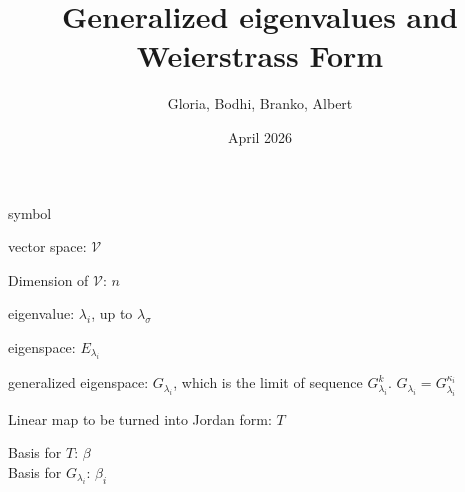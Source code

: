 \documentclass{article}
\title{Generalized eigenvalues and Weierstrass Form}
\author{Gloria, Bodhi, Branko, Albert}
\date{April 2026}
\theoremstyle{definition}
\newcommand{\0}{\vec{0}}
\newcommand{\vecspace}[1]{\mathcal{#1}}
\newcommand{\vsV}{\vecspace{V}}
\begin{document}
\begin{section}{symbol}

vector space: \(\vsV\)

Dimension of \(\vsV\): \(n\)

eigenvalue: \(\lambda_i\), up to \(\lambda_\sigma\)

eigenspace: \(E_{\lambda_i}\)

generalized eigenspace: \(G_{\lambda_i}\), which is the limit of sequence \(G_{\lambda_i}^{k}\). \(G_{\lambda_i}=G_{\lambda_i}^{\kappa_i}\)

Linear map to be turned into Jordan form: \(T\)

Basis for \(T\): \(\beta\) \\
Basis for \(G_{\lambda_i}\): \(\beta_i\) \\
    
\end{section}
\end{document}
